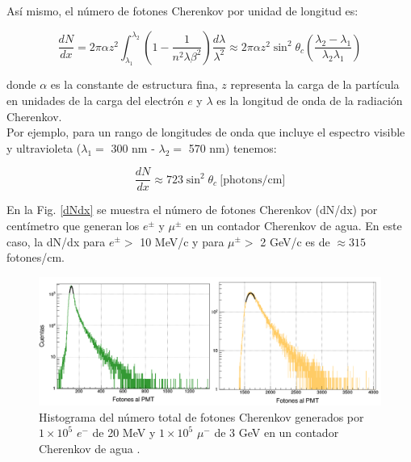 Así mismo, el número de fotones Cherenkov por unidad de longitud es:

\begin{equation}
   \frac{dN}{dx}=2 \pi \alpha z^2 \int_{\lambda_1}^{\lambda_2} \left(1- \frac{1}{n^2 \lambda \beta^2} \right) \frac{d \lambda}{\lambda^2} \approx 2 \pi \alpha z^2 \sin^2 \theta_c \left( \frac{\lambda_2-\lambda_1}{\lambda_2 \lambda_1} \right) 
\end{equation}

donde $\alpha$ es la constante de estructura fina, $z$ representa la carga de la partícula en unidades de la carga del electrón $e$ y $\lambda$ es la longitud de onda de la radiación Cherenkov.\\ 

Por ejemplo, para un rango de longitudes de onda que incluye el espectro visible y ultravioleta ($\lambda_1 =$ 300 nm - $\lambda_2 =$ 570 nm) tenemos:

\begin{equation}
   \frac{dN}{dx} \approx 723 \sin^2 \theta_c \ \text{[photons/cm]}
\end{equation}


En la Fig. \ref{dNdx} se muestra el número de fotones Cherenkov (dN/dx) por centímetro que generan los $e^{\pm}$ y $\mu^{\pm}$ en un contador Cherenkov de agua. En este caso, la dN/dx para $e^{\pm} > $  10 MeV/c y para $\mu^{\pm} > $ 2 GeV/c es de $\approx 315$ fotones/cm. 

\begin{figure}[h!]
\begin{center}
\includegraphics[width=1\textwidth]{Figures/e_mu_hist.png}
\caption[Histograma del número total de fotones Cherenkov generados por $1\times10^5$ $e^-$ de 20 MeV y $1\times10^5$ $\mu^-$ de 3 GeV en un contador Cherenkov de agua]{Histograma del número total de fotones Cherenkov generados por $1\times10^5$ $e^-$ de 20 MeV y $1\times10^5$ $\mu^-$ de 3 GeV en un contador Cherenkov de agua \cite{Vasquez2018}.}
\label{N_mue}
\end{center}
\end{figure}

